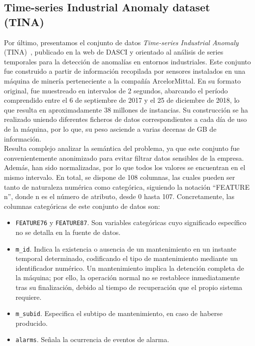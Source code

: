 \subsection{Time-series Industrial Anomaly dataset (TINA)}

Por último, presentamos el conjunto de datos \textit{Time-series Industrial Anomaly} (TINA)~\cite{tina_dasci_arcelor}, publicado en la web de DASCI y orientado al análisis de series temporales para la detección de anomalías en entornos industriales. Este conjunto fue construido a partir de información recopilada por sensores instalados en una máquina de minería perteneciente a la compañía ArcelorMittal. En su formato original, fue muestreado en intervalos de 2 segundos, abarcando el período comprendido entre el 6 de septiembre de 2017 y el 25 de diciembre de 2018, lo que resulta en aproximadamente 38 millones de instancias. Su construcción se ha realizado uniendo diferentes ficheros de datos correspondientes a cada día de uso de la máquina, por lo que, su peso asciende a varias decenas de GB de información.\\

Resulta complejo analizar la semántica del problema, ya que este conjunto fue convenientemente anonimizado para evitar filtrar datos sensibles de la empresa. Además, han sido normalizadas, por lo que todos los valores se encuentran en el mismo intervalo. En total, se dispone de 108 columnas, las cuales pueden ser tanto de naturaleza numérica como categórica, siguiendo la notación ``FEATURE n'', donde n es el número de atributo, desde 0 hasta 107. Concretamente, las columnas categóricas de este conjunto de datos son:

\begin{itemize}
	\item \texttt{FEATURE76} y \texttt{FEATURE87}. Son variables categóricas cuyo significado específico no se detalla en la fuente de datos.
	\item \texttt{m\_id}. Indica la existencia o ausencia de un mantenimiento en un instante temporal determinado, codificando el tipo de mantenimiento mediante un identificador numérico. Un mantenimiento implica la detención completa de la máquina; por ello, la operación normal no se restablece inmediatamente tras su finalización, debido al tiempo de recuperación que el propio sistema requiere.
	\item \texttt{m\_subid}. Especifica el subtipo de mantenimiento, en caso de haberse producido.
	\item \texttt{alarms}. Señala la ocurrencia de eventos de alarma.
\end{itemize}



